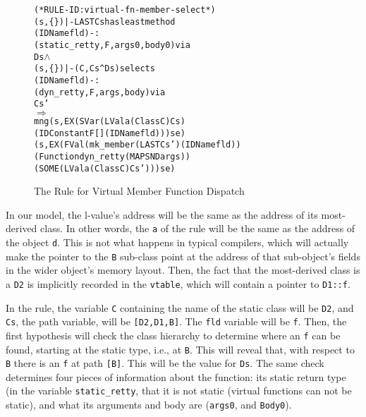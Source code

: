 \documentclass[11pt]{article}
\newcommand{\lbr}{\texttt{\{}}
\newcommand{\rbr}{\texttt{\}}}
\begin{document}
\begin{figure}[hbtp]
\begin{center}
\begin{minipage}{\textwidth}
%
\begin{alltt}
(* RULE-ID: virtual-fn-member-select *)
     (s,\lbr\rbr) |- LAST Cs has least method
                 (IDName fld) -:
                 (static_retty,F,args0,body0) via
                 Ds \(\land\)
     (s,\lbr\rbr) |- (C,Cs ^ Ds) selects
                 (IDName fld) -:
                 (dyn_retty,F,args,body) via
                 Cs'
   \(\Rightarrow\)
     mng (s, EX (SVar (LVal a (Class C) Cs)
                      (IDConstant F [] (IDName fld))) se)
         (s, EX (FVal (mk_member (LAST Cs') (IDName fld))
                      (Function dyn_retty (MAP SND args))
                      (SOME (LVal a (Class C) Cs'))) se)

\end{alltt}
\end{minipage}
\end{center}
\caption{The Rule for Virtual Member Function Dispatch}
\label{fig:virtual-fn-member-select}
\end{figure}

In our model, the l-value's address will be the same as the address of
its most-derived class.  In other words, the \texttt{a} of the rule
will be the same as the address of the object \texttt{d}.  This is not
what happens in typical compilers, which will actually make the
pointer to the \texttt{B} sub-class point at the address of that
sub-object's fields in the wider object's memory layout.  Then, the
fact that the most-derived class is a \texttt{D2} is implicitly
recorded in the \texttt{vtable}, which will contain a pointer to
\texttt{D1::f}.

In the rule, the variable \texttt{C} containing the name of the static
class will be \texttt{D2}, and \texttt{Cs}, the path variable, will be
\texttt{[D2,D1,B]}.  The \texttt{fld} variable will be \texttt{f}.
Then, the first hypothesis will check the class hierarchy to determine
where an \texttt{f} can be found, starting at the static type, i.e.,
at \texttt{B}.  This will reveal that, with respect to \texttt{B}
there is an \texttt{f} at path \texttt{[B]}.  This will be the value
for \texttt{Ds}.  The same check determines four pieces of information
about the function: its static return type (in the variable
\texttt{static_retty}, that it is not static (virtual functions can
not be static), and what its arguments and body are (\texttt{args0},
and \texttt{Body0}).
\end{document}
